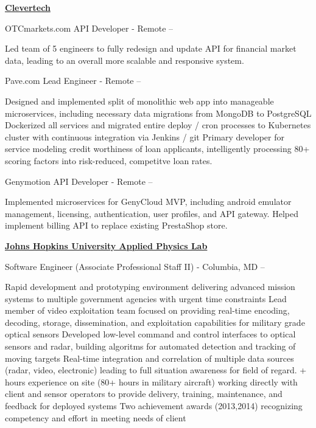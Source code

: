 \documentclass[a4paper,10pt,oneside]{article}
\begin{document}
\begin{minipage}[t][0pt]{\linewidth}
\begin{body}
\href{http://www.clevertech.biz/}
{\textbf{Clevertech}}
\par
OTCmarkets.com API Developer - Remote
\hfill
{} -- 
\begin{detail}
\BulletItem Led team of 5 engineers to fully redesign and update API for financial market data, leading to an overall more scalable and responsive system.
\end{detail}

\par
Pave.com Lead Engineer - Remote
\hfill
{} -- 
\begin{detail}
\BulletItem Designed and implemented split of monolithic web app into manageable microservices, including necessary data migrations from MongoDB to PostgreSQL
\BulletItem Dockerized all services and migrated entire deploy / cron processes to Kubernetes cluster with continuous integration via Jenkins / git
\BulletItem Primary developer for service modeling credit worthiness of loan applicants, intelligently processing 80+ scoring factors into risk-reduced, competitve loan rates.
\end{detail} 

\par
Genymotion API Developer - Remote
\hfill
{} -- 
\begin{detail}
\BulletItem Implemented microservices for GenyCloud MVP, including android emulator management, licensing, authentication, user profiles, and API gateway. 
\BulletItem Helped implement billing API to replace existing PrestaShop store. 
\end{detail}

\EntryGap

\href{http://www.jhuapl.edu/}
{\textbf{Johns Hopkins University Applied Physics Lab}}
\par
Software Engineer (Associate Professional Staff II) - Columbia, MD
\hfill
{} --
\begin{detail}

\BulletItem
Rapid development and prototyping environment delivering advanced mission systems to multiple government agencies with urgent time constraints
\BulletItem
Lead member of video exploitation team focused on providing real-time encoding, decoding, storage, dissemination, and exploitation capabilities for military grade optical sensors
\BulletItem
Developed low-level command and control interfaces to optical sensors and radar, building algoritms for automated detection and tracking of moving targets
\BulletItem
Real-time integration and correlation of multiple data sources (radar, video, electronic) leading to full situation awareness for field of regard.
+ hours experience on site (80+ hours in military aircraft) working directly with client and sensor operators to provide delivery, training, maintenance, and feedback for deployed systems
\BulletItem
Two achievement awards (2013,2014) recognizing competency and effort in meeting needs of client
\end{detail}


\end{body}
\end{minipage}
\end{document}
